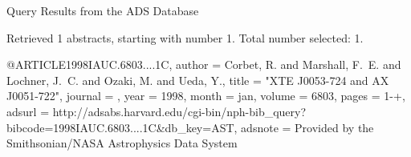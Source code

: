 Query Results from the ADS Database


Retrieved 1 abstracts, starting with number 1.  Total number selected: 1.

@ARTICLE{1998IAUC.6803....1C,
   author = {{Corbet}, R. and {Marshall}, F.~E. and {Lochner}, J.~C. and 
	{Ozaki}, M. and {Ueda}, Y.},
    title = "{XTE J0053-724 and AX J0051-722}",
  journal = {\iaucirc},
     year = 1998,
    month = jan,
   volume = 6803,
    pages = {1-+},
   adsurl = {http://adsabs.harvard.edu/cgi-bin/nph-bib_query?bibcode=1998IAUC.6803....1C&db_key=AST},
  adsnote = {Provided by the Smithsonian/NASA Astrophysics Data System}
}



